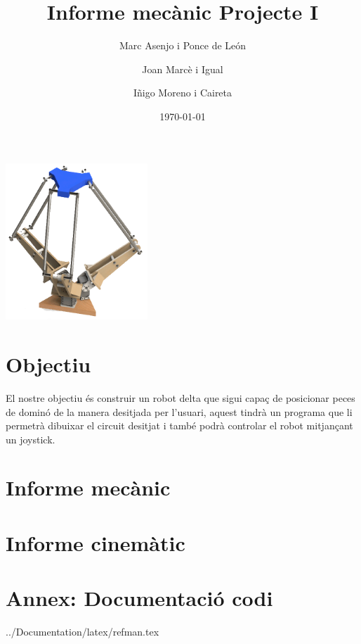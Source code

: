 \documentclass[a4paper, 12pt]{article}
\begin{document}
\title{Informe mecànic Projecte I}
\author{Marc Asenjo i Ponce de León \and
		Joan Marcè i Igual \and
		Iñigo Moreno i Caireta}
\date{\today}
\maketitle
\begin{center}
\includegraphics[width=0.4\textwidth]{./imgComp/logo}
\end{center}

\newpage
\tableofcontents{}

\newpage
\section{Objectiu}
El nostre objectiu és construir un robot delta que sigui capaç de posicionar peces de dominó de la manera desitjada per l'usuari, aquest tindrà un programa que li permetrà dibuixar el circuit desitjat i també podrà controlar el robot mitjançant un joystick.

\newpage
\section{Informe mecànic}


\newpage
\section{Informe cinemàtic}


\newpage
\section{Annex: Documentació codi}
{../Documentation/latex/refman.tex}
\end{document}
